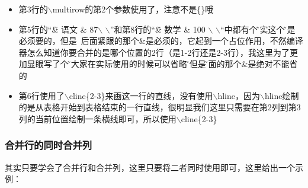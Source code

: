 \documentclass{article}
\begin{document}
\begin{itemize}
    \item 第3行的$\backslash$multirow的第2个参数使用了\*，注意不是\{\*\}哦
    
    \item 第5行的“\~\& 语文  \& 87$\backslash$ $\backslash$”和第8行的“\~\& 数学  
    \& 100 $\backslash$ $\backslash$“中都有个\~其实这个\~不是必须要的，但是~后面紧跟的那个\&是必须的，它起到一个占位作用，不然编译器怎么知道你要合并的是哪个位置的2行（是1-2行还是2-3行），我这里为了更加显眼写了个\~，大家在实际使用的时候可以省略\~，但是\~后面的那个\&是绝对不能省的
    
    \item 第6行使用了$\backslash$cline\{2-3\}来画这一行的直线，没有使用$\backslash$hline，因为$\backslash$hline绘制的是从表格开始到表格结束的一行直线，很明显我们这里只需要在第2列到第3列的当前位置绘制一条横线即可，所以使用$\backslash$cline\{2-3\}

\end{itemize}


\subsubsection{合并行的同时合并列}
其实只要学会了合并行和合并列，这里只要将二者同时使用即可，这里给出一个示例：
    
\end{document}

